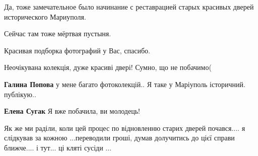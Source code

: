  
 
 
 
 

\qqSecCmt

\begin{itemize} %

Да, тоже замечательное было начинание с реставрацией старых красивых дверей
исторического Мариуполя.

Сейчас там тоже мёртвая пустыня.

Красивая подборка фотографий у Вас, спасибо.


Неочікувана колекція, дуже красиві двері! Сумно, що не побачимо(

\textbf{Галина Попова} у мене багато фотоколекцій.. Я таке у Маріуполь історичний. публікую..

\textbf{Елена Сугак} Я вже побачила, ви молодець!


Як же ми раділи, коли цей процес по відновленню старих дверей почався.... я
слідкував за кожною ...переводили гроші, думав долучитись до цієї справи
ближче.... і тут... ці кляті сусіди ...

\end{itemize} %
